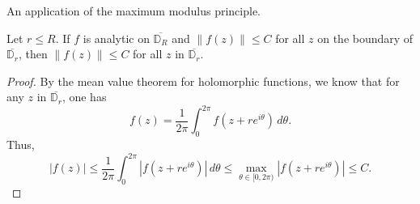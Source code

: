 \begin{lemma}
\label{AnalyticOn.norm_le_of_norm_le_on_sphere}
\leanok
An application of the maximum modulus principle.

    Let $r\leq R$. If $f$ is analytic on $\overline{\mathbb{D}_R}$ and $\|f(z)\|\leq C$ for all $z$
    on the boundary of $\overline{\mathbb{D}_r}$, then $\|f(z)\|\leq C$
    for all $z$ in $\overline{\mathbb{D}_r}$.
\end{lemma}
\begin{proof}
\leanok
By the mean value theorem for holomorphic functions, we know that for any
    $z$ in $\overline{\mathbb{D}_r}$, one has
    $$f(z)=\frac{1}{2\pi}\int_0^{2\pi}f(z+re^{i\theta})\,d\theta.$$
    Thus,
    $$|f(z)|\leq\frac{1}{2\pi}\int_0^{2\pi}|f(z+re^{i\theta})|\,d\theta
    \leq\max_{\theta\in[0,2\pi)}|f(z+re^{i\theta})|\leq C.$$
\end{proof}
